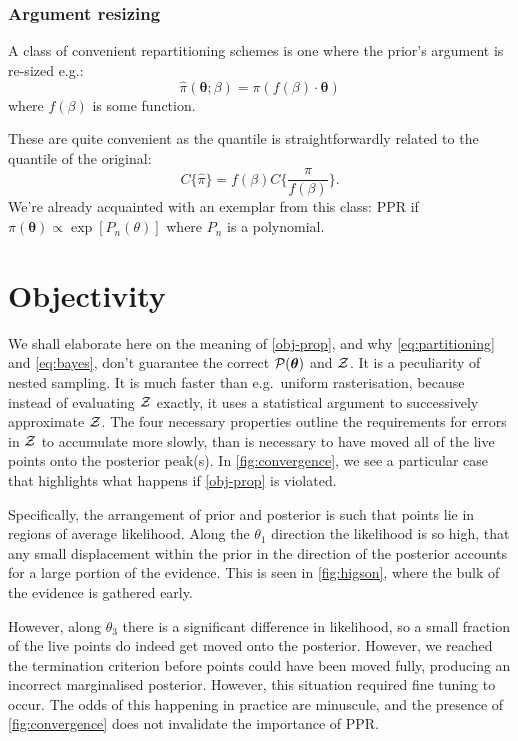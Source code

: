 \documentclass[usenatbib]{mnras}
\begin{document}
\subsubsection{Argument resizing}\label{sec:orgfe92f25}

A class of convenient repartitioning schemes is one where the prior's
argument is re-sized e.g.:
\begin{equation}
  \label{eq:argument-resize}
  \hat{\pi} (\bm{\theta}; \beta) = \pi (f(\beta)\cdot\bm{\theta})
\end{equation}
where \(f(\beta)\) is some function.

These are quite convenient as the quantile is straightforwardly
related to the quantile of the original:
\begin{equation}
  \label{eq:quantile-stuff}
  C\{\hat{\pi}\} = f(\beta) C\{\frac{\pi}{f(\beta)}\}.
\end{equation}
We're already acquainted with an exemplar from this class: PPR if
\( \pi (\bm{\theta}) \propto \exp [P_{n}(\theta)]\) where $P_{n}$ is a
polynomial.


\section{Objectivity\label{sec:objectivity}}
We shall elaborate here on the meaning of \cref{obj-prop}, and why
\cref{eq:partitioning} and \cref{eq:bayes}, don't guarantee the
correct \( {\cal P}(\bm{\theta})\) and ${\cal Z}$.  It is a
peculiarity of nested sampling. It is much faster than e.g.~uniform
rasterisation, because instead of evaluating ${\cal Z}$ exactly, it
uses a statistical argument to successively approximate ${\cal
  Z}$. The four necessary properties outline the requirements for
errors in ${\cal Z}$ to accumulate more slowly, than is necessary to
have moved all of the live points onto the posterior peak(s). In
\cref{fig:convergence}, we see a particular case that highlights what
happens if \cref{obj-prop} is violated.

Specifically, the arrangement of prior and posterior is such that
points lie in regions of average likelihood. Along the $\theta_{1}$
direction the likelihood is so high, that any small displacement
within the prior in the direction of the posterior accounts for a
large portion of the evidence. This is seen in \cref{fig:higson},
where the bulk of the evidence is gathered early.

However, along $\theta_{3}$ there is a significant difference in
likelihood, so a small fraction of the live points do indeed get moved
onto the posterior. However, we reached the termination criterion
before points could have been moved fully, producing an incorrect
marginalised posterior. However, this situation required fine tuning
to occur. The odds of this happening in practice are minuscule, and
the presence of \cref{fig:convergence} does not invalidate the
importance of PPR. 
\end{document}
